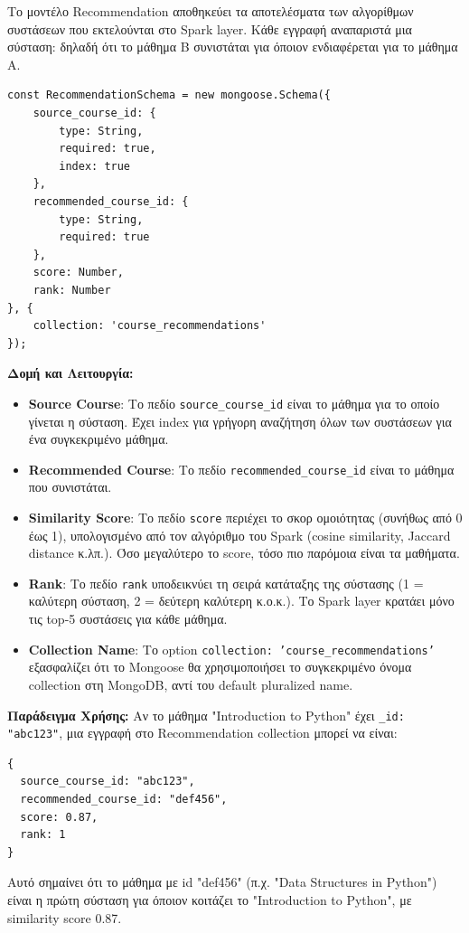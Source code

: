 \documentclass[a4paper,12pt]{article}
\begin{document}
Το μοντέλο Recommendation αποθηκεύει τα αποτελέσματα των αλγορίθμων συστάσεων που εκτελούνται στο Spark layer. Κάθε εγγραφή αναπαριστά μια σύσταση: δηλαδή ότι το μάθημα Β συνιστάται για όποιον ενδιαφέρεται για το μάθημα Α.

\begin{verbatim}
const RecommendationSchema = new mongoose.Schema({
    source_course_id: { 
        type: String, 
        required: true, 
        index: true 
    },
    recommended_course_id: { 
        type: String, 
        required: true 
    },
    score: Number,
    rank: Number
}, { 
    collection: 'course_recommendations' 
});
\end{verbatim}

\textbf{Δομή και Λειτουργία:}

\begin{itemize}
    \item \textbf{Source Course}: Το πεδίο \texttt{source\_course\_id} είναι το μάθημα για το οποίο γίνεται η σύσταση. Έχει index για γρήγορη αναζήτηση όλων των συστάσεων για ένα συγκεκριμένο μάθημα.
    
    \item \textbf{Recommended Course}: Το πεδίο \texttt{recommended\_course\_id} είναι το μάθημα που συνιστάται.
    
    \item \textbf{Similarity Score}: Το πεδίο \texttt{score} περιέχει το σκορ ομοιότητας (συνήθως από 0 έως 1), υπολογισμένο από τον αλγόριθμο του Spark (cosine similarity, Jaccard distance κ.λπ.). Όσο μεγαλύτερο το score, τόσο πιο παρόμοια είναι τα μαθήματα.
    
    \item \textbf{Rank}: Το πεδίο \texttt{rank} υποδεικνύει τη σειρά κατάταξης της σύστασης (1 = καλύτερη σύσταση, 2 = δεύτερη καλύτερη κ.ο.κ.). Το Spark layer κρατάει μόνο τις top-5 συστάσεις για κάθε μάθημα.
    
    \item \textbf{Collection Name}: Το option \texttt{collection: 'course\_recommendations'} εξασφαλίζει ότι το Mongoose θα χρησιμοποιήσει το συγκεκριμένο όνομα collection στη MongoDB, αντί του default pluralized name.
\end{itemize}

\textbf{Παράδειγμα Χρήσης:}
Αν το μάθημα "Introduction to Python" έχει \texttt{\_id: "abc123"}, μια εγγραφή στο Recommendation collection μπορεί να είναι:
\begin{verbatim}
{
  source_course_id: "abc123",
  recommended_course_id: "def456",
  score: 0.87,
  rank: 1
}
\end{verbatim}
Αυτό σημαίνει ότι το μάθημα με id "def456" (π.χ. "Data Structures in Python") είναι η πρώτη σύσταση για όποιον κοιτάζει το "Introduction to Python", με similarity score 0.87.
\end{document}
